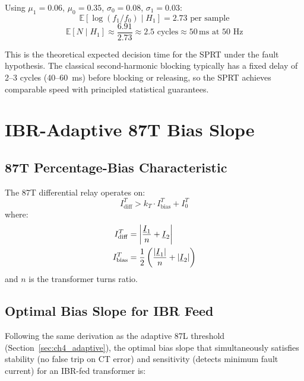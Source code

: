 Using $\mu_1 = 0.06$, $\mu_0 = 0.35$, $\sigma_0 = 0.08$, $\sigma_1 = 0.03$:
\begin{equation}
  \mathbb{E}[\log(f_1/f_0) \mid H_1] = 2.73 \text{ per sample}
\end{equation}
\begin{equation}
  \mathbb{E}[N \mid H_1] \approx \frac{6.91}{2.73} \approx 2.5 \text{ cycles}
  \approx 50\,\text{ms at 50~Hz}
\end{equation}

This is the theoretical expected decision time for the SPRT under the fault
hypothesis. The classical second-harmonic blocking typically has a fixed
delay of 2--3 cycles (40--60~ms) before blocking or releasing, so the SPRT
achieves comparable speed with principled statistical guarantees.

\section{IBR-Adaptive 87T Bias Slope}
\label{sec:ch6_adaptive_bias}

\subsection{87T Percentage-Bias Characteristic}

The 87T differential relay operates on:
\begin{equation}
  I_\mathrm{diff}^T > k_T \cdot I_\mathrm{bias}^T + I_0^T
  \label{eq:ch6_87t_criterion}
\end{equation}
where:
\begin{align}
  I_\mathrm{diff}^T &= \left|\frac{\underline{I}_1}{n} + \underline{I}_2\right|
  \label{eq:ch6_87t_diff} \\
  I_\mathrm{bias}^T &= \frac{1}{2}\left(\frac{|\underline{I}_1|}{n} + |\underline{I}_2|\right)
  \label{eq:ch6_87t_bias}
\end{align}
and $n$ is the transformer turns ratio.

\subsection{Optimal Bias Slope for IBR Feed}

Following the same derivation as the adaptive 87L threshold
(Section~\ref{sec:ch4_adaptive}), the optimal bias slope that simultaneously
satisfies stability (no false trip on CT error) and sensitivity (detects
minimum fault current) for an IBR-fed transformer is:

